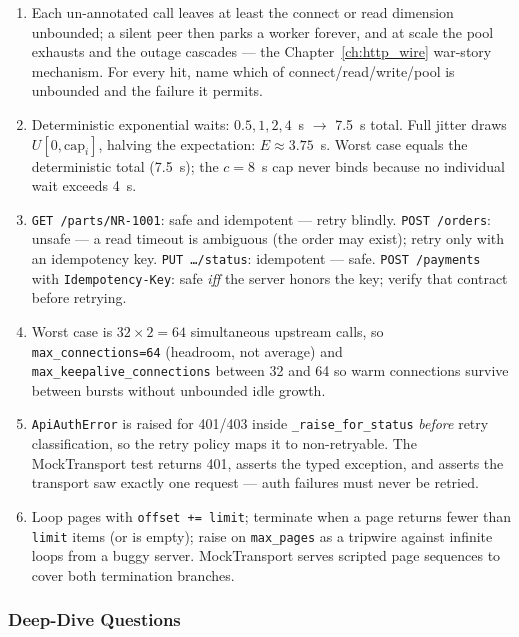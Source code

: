 \begin{enumerate}[leftmargin=2.2em]
  \item Each un-annotated call leaves at least the connect or read dimension
    unbounded; a silent peer then parks a worker forever, and at scale the
    pool exhausts and the outage cascades --- the Chapter~\ref{ch:http_wire}
    war-story mechanism. For every hit, name which of connect/read/write/pool
    is unbounded and the failure it permits.
  \item Deterministic exponential waits: $0.5, 1, 2, 4$~s $\to$ 7.5~s total.
    Full jitter draws $U[0, \text{cap}_i]$, halving the expectation:
    $E \approx 3.75$~s. Worst case equals the deterministic total (7.5~s);
    the $c=8$~s cap never binds because no individual wait exceeds 4~s.
  \item \texttt{GET /parts/NR-1001}: safe and idempotent --- retry blindly.
    \texttt{POST /orders}: unsafe --- a read timeout is ambiguous (the order
    may exist); retry only with an idempotency key. \texttt{PUT
    \ldots/status}: idempotent --- safe. \texttt{POST /payments} with
    \texttt{Idempotency-Key}: safe \emph{iff} the server honors the key;
    verify that contract before retrying.
  \item Worst case is $32 \times 2 = 64$ simultaneous upstream calls, so
    \texttt{max\_connections=64} (headroom, not average) and
    \texttt{max\_keepalive\_connections} between 32 and 64 so warm
    connections survive between bursts without unbounded idle growth.
  \item \texttt{ApiAuthError} is raised for 401/403 inside
    \texttt{\_raise\_for\_status} \emph{before} retry classification, so the
    retry policy maps it to non-retryable. The MockTransport test returns
    401, asserts the typed exception, and asserts the transport saw exactly
    one request --- auth failures must never be retried.
  \item Loop pages with \texttt{offset += limit}; terminate when a page
    returns fewer than \texttt{limit} items (or is empty); raise on
    \texttt{max\_pages} as a tripwire against infinite loops from a buggy
    server. MockTransport serves scripted page sequences to cover both
    termination branches.
\end{enumerate}

\subsubsection*{Deep-Dive Questions}

